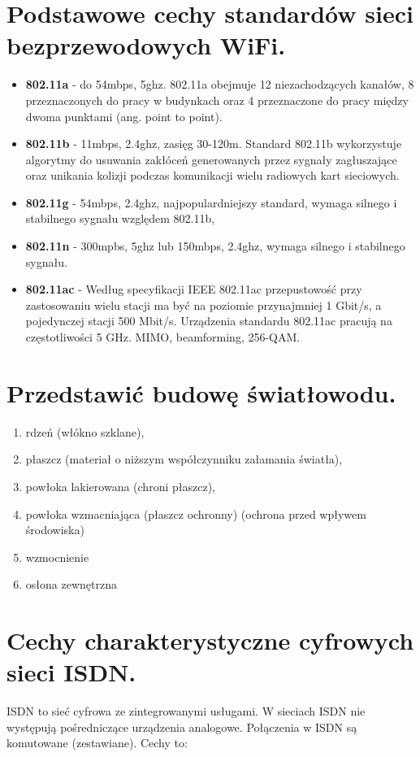 \documentclass[12pt,a4paper]{article}
\begin{document}
	\section{Podstawowe cechy standardów sieci bezprzewodowych WiFi.}
	\begin{itemize}
		\item \textbf{802.11a} - do 54mbps, 5ghz. 802.11a obejmuje 12 niezachodzących kanałów, 8 przeznaczonych do pracy w budynkach oraz 4 przeznaczone do pracy między dwoma punktami (ang. point to point). 
		\item \textbf{802.11b} - 11mbps, 2.4ghz, zasięg 30-120m. Standard 802.11b wykorzystuje algorytmy do usuwania zakłóceń generowanych przez sygnały zagłuszające oraz unikania kolizji podczas komunikacji wielu radiowych kart sieciowych.
		\item \textbf{802.11g} - 54mbps, 2.4ghz, najpopulardniejszy standard, wymaga silnego i stabilnego sygnału względem 802.11b,
		\item \textbf{802.11n} - 300mpbs, 5ghz lub 150mbps, 2.4ghz, wymaga silnego i stabilnego sygnału.
		\item \textbf{802.11ac} - Według specyfikacji IEEE 802.11ac przepustowość przy zastosowaniu wielu stacji ma być na poziomie przynajmniej 1 Gbit/s, a pojedynczej stacji 500 Mbit/s. Urządzenia standardu 802.11ac pracują na częstotliwości 5 GHz. MIMO, beamforming, 256-QAM.
	\end{itemize}

	\section{Przedstawić budowę światłowodu.}
	\begin{enumerate}
		\item rdzeń (włókno szklane), 
		\item płaszcz (materiał o niższym współczynniku załamania światła), 
		\item powłoka lakierowana (chroni płaszcz), 
		\item powłoka wzmacniająca (płaszcz ochronny) (ochrona przed wpływem środowiska)
		\item wzmocnienie
		\item osłona zewnętrzna
	\end{enumerate}

	\section{Cechy charakterystyczne cyfrowych sieci ISDN.}
	ISDN to sieć cyfrowa ze zintegrowanymi usługami. W sieciach ISDN nie występują pośredniczące urządzenia analogowe. Połączenia w ISDN są komutowane (zestawiane). Cechy to:
	
\end{document}
